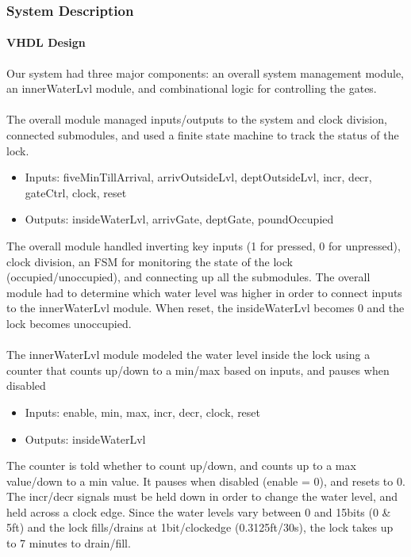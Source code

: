 \documentclass{article}
\begin{document}
		\subsubsection{System Description}
      \paragraph{VHDL Design} Our system had three major components: an overall system management module, an innerWaterLvl module, and combinational logic for controlling the gates.

      \paragraph{} The overall module managed inputs/outputs to the system and clock division, connected submodules, and used a finite state machine to track the status of the lock.
      \begin{itemize}
        \item Inputs: fiveMinTillArrival, arrivOutsideLvl, deptOutsideLvl, incr, decr, gateCtrl, clock, reset
        \item Outputs: insideWaterLvl, arrivGate, deptGate, poundOccupied
      \end{itemize}
      The overall module handled inverting key inputs (1 for pressed, 0 for unpressed), clock division, an FSM for monitoring the state of the lock (occupied/unoccupied), and connecting up all the submodules. The overall module had to determine which water level was higher in order to connect inputs to the innerWaterLvl module. When reset, the insideWaterLvl becomes 0 and the lock becomes unoccupied.

      \paragraph{} The innerWaterLvl module modeled the water level inside the lock using a counter that counts up/down to a min/max based on inputs, and pauses when disabled
      \begin{itemize}
        \item Inputs: enable, min, max, incr, decr, clock, reset
        \item Outputs: insideWaterLvl
      \end{itemize}
      The counter is told whether to count up/down, and counts up to a max value/down to a min value. It pauses when disabled (enable = 0), and resets to 0. The incr/decr signals must be held down in order to change the water level, and held across a clock edge. Since the water levels vary between 0 and 15bits (0 \& 5ft) and the lock fills/drains at 1bit/clockedge (0.3125ft/30s), the lock takes up to 7 minutes to drain/fill.
\end{document}
